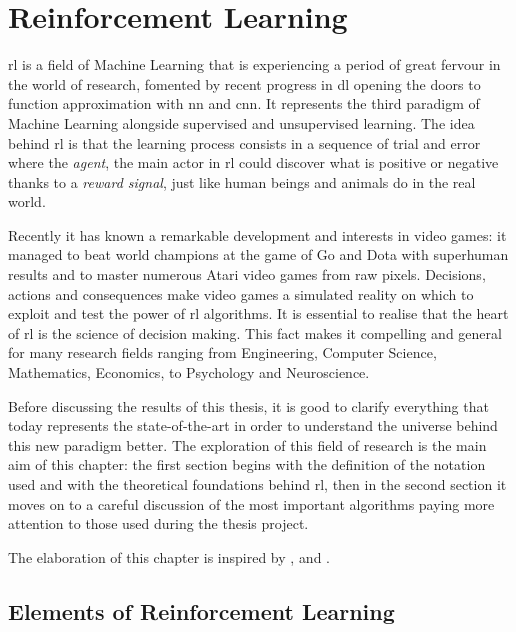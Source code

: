 \chapter{Reinforcement Learning}

\acrfull{rl} is a field of Machine Learning that is experiencing a period of great fervour in the world of research, fomented by recent progress in \acrfull{dl} opening the doors to function approximation with \acrfull{nn} and \acrfull{cnn}. It represents the third paradigm of Machine Learning alongside supervised and unsupervised learning. The idea behind \acrshort{rl} is that the learning process consists in a sequence of trial and error where the \textit{agent}, the main actor in \acrshort{rl} could discover what is positive or negative thanks to a \textit{reward signal}, just like human beings and animals do in the real world. 

Recently it has known a remarkable development and interests in video games: it managed to beat world champions at the game of Go \cite{silver2016mastering} and Dota with superhuman results and to master numerous Atari video games \cite{mnih2013playing} from raw pixels. Decisions, actions and consequences make video games a simulated reality on which to exploit and test the power of \acrshort{rl} algorithms.
It is essential to realise that the heart of \acrshort{rl} is the science of decision making. This fact makes it compelling and general for many research fields ranging from Engineering, Computer Science, Mathematics, Economics, to Psychology and Neuroscience.

Before discussing the results of this thesis, it is good to clarify everything that today represents the state-of-the-art in order to understand the universe behind this new paradigm better.
The exploration of this field of research is the main aim of this chapter: the first section begins with the definition of the notation used and with the theoretical foundations behind \acrshort{rl}, then in the second section it moves on to a careful discussion of the most important algorithms paying more attention to those used during the thesis project.

The elaboration of this chapter is inspired by \cite{silver2015lectures}, \cite{sutton2018reinforcement} and \cite{openai2018spinningup}.

\section{Elements of Reinforcement Learning}

